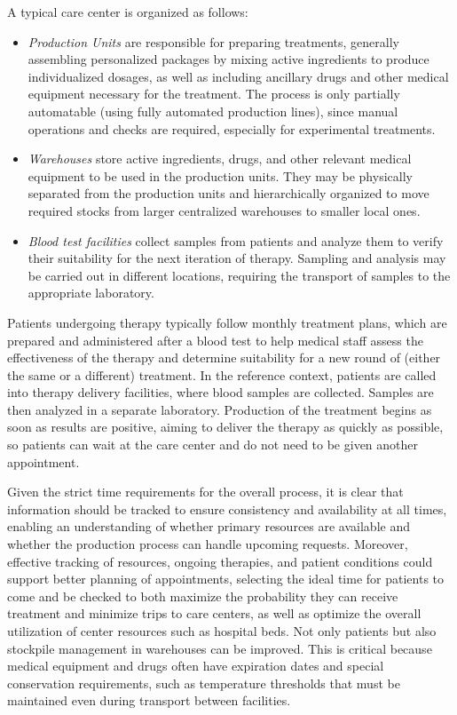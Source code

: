 A typical care center is organized as follows:
\begin{itemize}
    \item \textit{Production Units} are responsible for preparing treatments, generally assembling personalized packages by mixing active ingredients to produce individualized dosages, as well as including ancillary drugs and other medical equipment necessary for the treatment. The process is only partially automatable (using fully automated production lines), since manual operations and checks are required, especially for experimental treatments.

    \item \textit{Warehouses} store active ingredients, drugs, and other relevant medical equipment to be used in the production units. They may be physically separated from the production units and hierarchically organized to move required stocks from larger centralized warehouses to smaller local ones.

    \item \textit{Blood test facilities} collect samples from patients and analyze them to verify their suitability for the next iteration of therapy. Sampling and analysis may be carried out in different locations, requiring the transport of samples to the appropriate laboratory.

\end{itemize}

Patients undergoing therapy typically follow monthly treatment plans, which are prepared and administered after a blood test to help medical staff assess the effectiveness of the therapy and determine suitability for a new round of (either the same or a different) treatment.
%
In the reference context, patients are called into therapy delivery facilities, where blood samples are collected.
%
Samples are then analyzed in a separate laboratory. Production of the treatment begins as soon as results are positive, aiming to deliver the therapy as quickly as possible, so patients can wait at the care center and do not need to be given another appointment.

Given the strict time requirements for the overall process, it is clear that information should be tracked to ensure consistency and availability at all times, enabling an understanding of whether primary resources are available and whether the production process can handle upcoming requests.
%
Moreover, effective tracking of resources, ongoing therapies, and patient conditions could support better planning of appointments, selecting the ideal time for patients to come and be checked to both maximize the probability they can receive treatment and minimize trips to care centers, as well as optimize the overall utilization of center resources such as hospital beds.
%
Not only patients but also stockpile management in warehouses can be improved. This is critical because medical equipment and drugs often have expiration dates and special conservation requirements, such as temperature thresholds that must be maintained even during transport between facilities.

